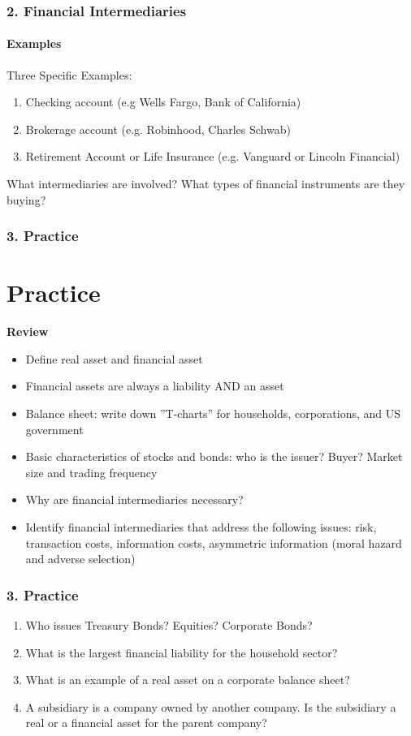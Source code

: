 \documentclass{beamer}
\begin{document}
\begin{frame}[t]
    \frametitle{2. Financial Intermediaries}
    \framesubtitle{Examples}
    
    Three Specific Examples:

    \begin{enumerate}
        \item Checking account (e.g Wells Fargo, Bank of California)
        \item Brokerage account (e.g. Robinhood, Charles Schwab)
        \item Retirement Account or Life Insurance (e.g. Vanguard or Lincoln Financial)
    \end{enumerate}
    \vspace{1em}

    What intermediaries are involved?   What types of financial instruments are they buying?

\end{frame}

\begin{practiceframe}[t]
    \frametitle{3. Practice}
    \section{Practice}

    \textbf{Review}
    \begin{itemize}
        \item Define real asset and financial asset
        \item Financial assets are always a liability AND an asset
        \item Balance sheet: write down ”T-charts” for households, corporations, and US government
        \item Basic characteristics of stocks and bonds: who is the issuer?  Buyer?  Market size and trading frequency
        \item Why are financial intermediaries necessary?
        \item Identify financial intermediaries that address the following issues: risk, transaction costs, information costs, asymmetric information (moral hazard and adverse selection)
    \end{itemize}

\end{practiceframe}

\begin{practiceframe}[t]
    \frametitle{3. Practice}

    \begin{enumerate}
        \item Who issues Treasury Bonds?   Equities?  Corporate Bonds?
        \item What is the largest financial liability for the household sector?
        \item What is an example of a real asset on a corporate balance sheet?
        \item A subsidiary is a company owned by another company.  Is the subsidiary a real or a financial asset for the parent company?
    \end{enumerate}


\end{practiceframe}
\end{document}
